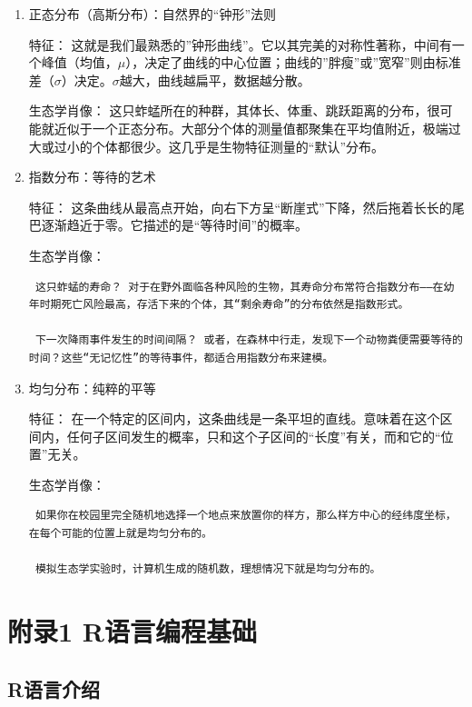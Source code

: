 \documentclass[
]{book}
\begin{document}
\begin{enumerate}
\def\labelenumi{\arabic{enumi}.}
\item
  正态分布（高斯分布）：自然界的``钟形''法则

  特征： 这就是我们最熟悉的''钟形曲线''。它以其完美的对称性著称，中间有一个峰值（均值，\(\mu\)），决定了曲线的中心位置；曲线的''胖瘦''或''宽窄''则由标准差（\(\sigma\)）决定。\(\sigma\)越大，曲线越扁平，数据越分散。

  生态学肖像： 这只蚱蜢所在的种群，其体长、体重、跳跃距离的分布，很可能就近似于一个正态分布。大部分个体的测量值都聚集在平均值附近，极端过大或过小的个体都很少。这几乎是生物特征测量的``默认''分布。
\item
  指数分布：等待的艺术

  特征： 这条曲线从最高点开始，向右下方呈``断崖式''下降，然后拖着长长的尾巴逐渐趋近于零。它描述的是``等待时间''的概率。

  生态学肖像：

\begin{verbatim}
 这只蚱蜢的寿命？ 对于在野外面临各种风险的生物，其寿命分布常符合指数分布——在幼年时期死亡风险最高，存活下来的个体，其“剩余寿命”的分布依然是指数形式。

 下一次降雨事件发生的时间间隔？ 或者，在森林中行走，发现下一个动物粪便需要等待的时间？这些“无记忆性”的等待事件，都适合用指数分布来建模。
\end{verbatim}
\item
  均匀分布：纯粹的平等

  特征： 在一个特定的区间内，这条曲线是一条平坦的直线。意味着在这个区间内，任何子区间发生的概率，只和这个子区间的``长度''有关，而和它的``位置''无关。

  生态学肖像：

\begin{verbatim}
 如果你在校园里完全随机地选择一个地点来放置你的样方，那么样方中心的经纬度坐标，在每个可能的位置上就是均匀分布的。

 模拟生态学实验时，计算机生成的随机数，理想情况下就是均匀分布的。
\end{verbatim}
\end{enumerate}

\hypertarget{ux9644ux5f551-rux8bedux8a00ux7f16ux7a0bux57faux7840}{%
\chapter{附录1 R语言编程基础}\label{ux9644ux5f551-rux8bedux8a00ux7f16ux7a0bux57faux7840}}

\hypertarget{rux8bedux8a00ux4ecbux7ecd}{%
\section{R语言介绍}\label{rux8bedux8a00ux4ecbux7ecd}}
\end{document}
